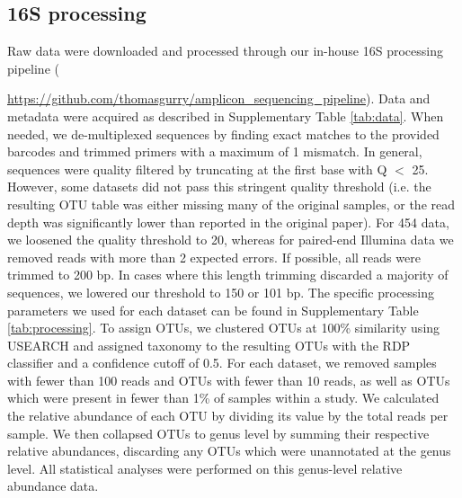 \documentclass{article}
\begin{document}
\subsection*{16S processing}
Raw data were downloaded and processed through our in-house 16S processing pipeline ({\url{ https://github.com/thomasgurry/amplicon_sequencing_pipeline}).
Data and metadata were acquired as described in Supplementary Table \ref{tab:data}.
When needed, we de-multiplexed sequences by finding exact matches to the provided barcodes and trimmed primers with a maximum of 1 mismatch.
In general, sequences were quality filtered by truncating at the first base with Q $<$ 25.
However, some datasets did not pass this stringent quality threshold (i.e. the resulting OTU table was either missing many of the original samples, or the read depth was significantly lower than reported in the original paper).
For 454 data, we loosened the quality threshold to 20, whereas for paired-end Illumina data we removed reads with more than 2 expected errors.
If possible, all reads were trimmed to 200 bp.
In cases where this length trimming discarded a majority of sequences, we lowered our threshold to 150 or 101 bp.
The specific processing parameters we used for each dataset can be found in Supplementary Table \ref{tab:processing}.
To assign OTUs, we clustered OTUs at 100\% similarity using USEARCH \cite{edgar-usearch-2010} and assigned taxonomy to the resulting OTUs with the RDP classifier \cite{wang2007naive} and a confidence cutoff of 0.5.
For each dataset, we removed samples with fewer than 100 reads and OTUs with fewer than 10 reads, as well as OTUs which were present in fewer than 1\% of samples within a study.
We calculated the relative abundance of each OTU by dividing its value by the total reads per sample.
We then collapsed OTUs to genus level by summing their respective relative abundances, discarding any OTUs which were unannotated at the genus level.
All statistical analyses were performed on this genus-level relative abundance data.

}
\end{document}
